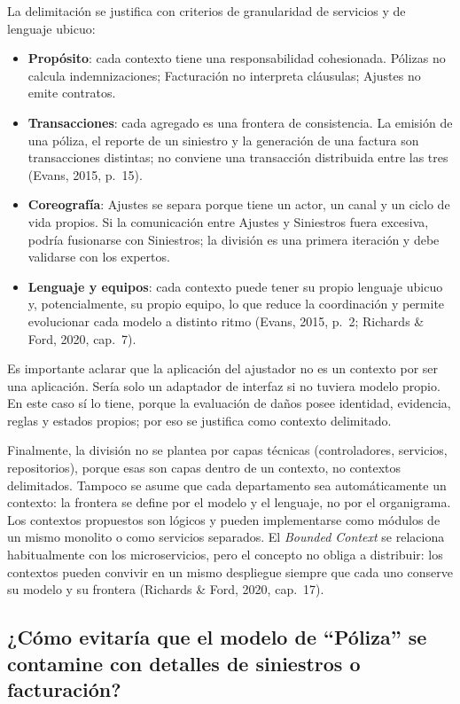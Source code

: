 \documentclass[12pt,a4paper]{article}
\begin{document}
La delimitación se justifica con criterios de granularidad de servicios y de lenguaje ubicuo:

\begin{itemize}[label=$\cdot$]
  \item \textbf{Propósito}: cada contexto tiene una responsabilidad cohesionada. Pólizas no calcula indemnizaciones; Facturación no interpreta cláusulas; Ajustes no emite contratos.
  \item \textbf{Transacciones}: cada agregado es una frontera de consistencia. La emisión de una póliza, el reporte de un siniestro y la generación de una factura son transacciones distintas; no conviene una transacción distribuida entre las tres (Evans, 2015, p.~15).
  \item \textbf{Coreografía}: Ajustes se separa porque tiene un actor, un canal y un ciclo de vida propios. Si la comunicación entre Ajustes y Siniestros fuera excesiva, podría fusionarse con Siniestros; la división es una primera iteración y debe validarse con los expertos.
  \item \textbf{Lenguaje y equipos}: cada contexto puede tener su propio lenguaje ubicuo y, potencialmente, su propio equipo, lo que reduce la coordinación y permite evolucionar cada modelo a distinto ritmo (Evans, 2015, p.~2; Richards \& Ford, 2020, cap.~7).
\end{itemize}

Es importante aclarar que la aplicación del ajustador no es un contexto por ser una aplicación. Sería solo un adaptador de interfaz si no tuviera modelo propio. En este caso sí lo tiene, porque la evaluación de daños posee identidad, evidencia, reglas y estados propios; por eso se justifica como contexto delimitado.

Finalmente, la división no se plantea por capas técnicas (controladores, servicios, repositorios), porque esas son capas dentro de un contexto, no contextos delimitados. Tampoco se asume que cada departamento sea automáticamente un contexto: la frontera se define por el modelo y el lenguaje, no por el organigrama. Los contextos propuestos son lógicos y pueden implementarse como módulos de un mismo monolito o como servicios separados. El \textit{Bounded Context} se relaciona habitualmente con los microservicios, pero el concepto no obliga a distribuir: los contextos pueden convivir en un mismo despliegue siempre que cada uno conserve su modelo y su frontera (Richards \& Ford, 2020, cap.~17).

\subsection{¿Cómo evitaría que el modelo de ``Póliza'' se contamine con detalles de siniestros o facturación?}
\end{document}
